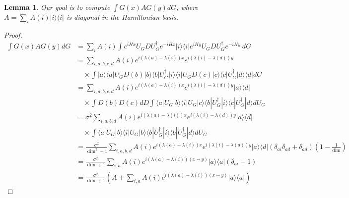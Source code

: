 \documentclass{article}
\newtheorem{lemma}[theorem]{Lemma}
\newcommand{\ket}[1]{|#1\rangle}
\newcommand{\bra}[1]{\langle #1|}
\newcommand{\ketbra}[2]{| #1\rangle\! \langle #2|}
\newcommand{\parens}[1]{\left( #1 \right)}
\begin{document}
\begin{lemma} \label{lem:sandwiched_interaction}
    Our goal is to compute $\int G(x) A G(y) dG$, where $A = \sum_i A(i) \ketbra{i}{i}$ is diagonal in the Hamiltonian basis.
\end{lemma}
\begin{proof}
    \begin{align}
        \int G(x) A G(y) dG &= \sum_i A(i) \int e^{i H x} U_G D U_G^{\dagger} e^{-i H x} \ketbra{i}{i} e^{i H y} U_G D U_G^\dagger e^{-i H y} ~dG \\
        &= \sum_{i, a, b,c, d} A(i) e^{i (\lambda(a) - \lambda(i))x} e^{i (\lambda(i) - \lambda(d))y} \nonumber \\
        &\quad \times \int \ketbra{a}{a} U_G D(b) \ketbra{b}{b} U_G^\dagger \ketbra{i}{i} U_G D(c) \ketbra{c}{c} U_G^\dagger \ketbra{d}{d} dG \\
        &= \sum_{i, a, b,c, d} A(i) e^{i (\lambda(a) - \lambda(i))x} e^{i (\lambda(i) - \lambda(d))y} \ketbra{a}{d} \nonumber \\
        &\quad \times \int D(b) D(c) dD \int \bra{a} U_G \ket{b} \bra{i} U_G \ket{c} \bra{b} U_G^\dagger \ket{i} \bra{c} U_G^\dagger \ket{d} dU_G \\
        &= \sigma^2 \sum_{i,a,b,d} A(i) e^{i (\lambda(a) - \lambda(i))x} e^{i (\lambda(i) - \lambda(d))y} \ketbra{a}{d} \nonumber \\ 
        &\quad \times \int \bra{a} U_G \ket{b} \bra{i} U_G \ket{b} \bra{b} U_G^\dagger \ket{i} \bra{b} U_G^\dagger \ket{d} dU_G \\
        &= \frac{\sigma^2}{\dim^2 - 1} \sum_{i,a,b,d} A(i) e^{i (\lambda(a) - \lambda(i))x} e^{i (\lambda(i) - \lambda(d))y} \ketbra{a}{d} (\delta_{ai} \delta_{ad} + \delta_{ad})(1 - \frac{1}{\dim}) \\
        &= \frac{\sigma^2}{\dim + 1} \sum_{i, a} A(i) e^{i (\lambda(a) - \lambda(i))(x - y)} \ketbra{a}{a} (\delta_{ai} + 1) \\
        &= \frac{\sigma^2}{\dim + 1} \parens{ A + \sum_{i, a} A(i) e^{i (\lambda(a) - \lambda(i))(x - y)} \ketbra{a}{a} }
    \end{align}
\end{proof}
\end{document}
